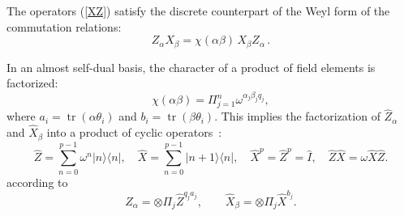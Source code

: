 \documentclass[quantumrep,article,accept,pdftex,moreauthors]{Definitions/mdpi}
\DeclareMathOperator{\tr}{tr}
\begin{document}
The operators (\ref{XZ}) satisfy the discrete counterpart of the Weyl form of
the commutation relations:
\begin{equation}
  Z_{\alpha}X_{\beta }
  = \chi \left( \alpha\beta \right) \, X_{\beta }Z_{\alpha} \,.
  \label{commutation_relation}
\end{equation}

In an almost self-dual basis, the character of a product of field elements is
factorized:
\begin{equation}
  \chi\left( \alpha\beta \right)
  = \Pi_{j=1}^{n} \omega^{\alpha_{j}\beta_{j}q_{j}},
  \label{chi fact}
\end{equation}
where $a_{i}=\tr(\alpha \theta_{i})$ and $b_{i} =
\tr(\beta \theta_{i})$. This implies the factorization of
$\hat{Z}_{\alpha}$ and $\hat{X}_{\beta }$ into a product of cyclic operators~\cite{Schwinger1,Schwinger2}:
\begin{equation}
  \hat{Z}
  = \sum_{n=0}^{p-1} \omega^{n} |n\rangle \langle n|, \quad \hat{X}
  = \sum_{n=0}^{p-1} |n+1\rangle \langle n|,
  \quad \hat{X}^{p} = \hat{Z}^{p} = \hat{I},
  \quad \hat{Z}\hat{X} = \omega \hat{X}\hat{Z}.
\end{equation}
according to
\begin{equation}
  \hat{Z}_{\alpha}
  = \otimes \Pi_{j}\hat{Z}^{q_{j}a_{j}},
  \qquad \hat{X}_{\beta}
  = \otimes \Pi_{j}\hat{X}^{b_{j}}.
  \label{ZXq}
\end{equation}
\end{document}
